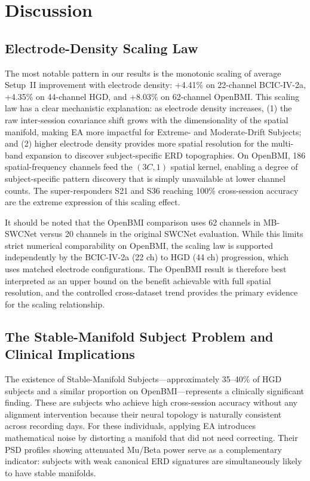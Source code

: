\documentclass[conference]{IEEEtran}
\begin{document}
\section{Discussion}

\subsection{Electrode-Density Scaling Law}

The most notable pattern in our results is the monotonic scaling of average Setup~II improvement with electrode density: +4.41\% on 22-channel BCIC-IV-2a, +4.35\% on 44-channel HGD, and +8.03\% on 62-channel OpenBMI. This scaling law has a clear mechanistic explanation: as electrode density increases, (1) the raw inter-session covariance shift grows with the dimensionality of the spatial manifold, making EA more impactful for Extreme- and Moderate-Drift Subjects; and (2) higher electrode density provides more spatial resolution for the multi-band expansion to discover subject-specific ERD topographies. On OpenBMI, 186 spatial-frequency channels feed the $(3C, 1)$ spatial kernel, enabling a degree of subject-specific pattern discovery that is simply unavailable at lower channel counts. The super-responders S21 and S36 reaching 100\% cross-session accuracy are the extreme expression of this scaling effect.

It should be noted that the OpenBMI comparison uses 62 channels in MB-SWCNet versus 20 channels in the original SWCNet evaluation. While this limits strict numerical comparability on OpenBMI, the scaling law is supported independently by the BCIC-IV-2a (22 ch) to HGD (44 ch) progression, which uses matched electrode configurations. The OpenBMI result is therefore best interpreted as an upper bound on the benefit achievable with full spatial resolution, and the controlled cross-dataset trend provides the primary evidence for the scaling relationship.

\subsection{The Stable-Manifold Subject Problem and Clinical Implications}

The existence of Stable-Manifold Subjects---approximately 35--40\% of HGD subjects and a similar proportion on OpenBMI---represents a clinically significant finding. These are subjects who achieve high cross-session accuracy without any alignment intervention because their neural topology is naturally consistent across recording days. For these individuals, applying EA introduces mathematical noise by distorting a manifold that did not need correcting. Their PSD profiles showing attenuated Mu/Beta power serve as a complementary indicator: subjects with weak canonical ERD signatures are simultaneously likely to have stable manifolds.
\end{document}
